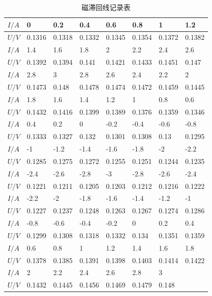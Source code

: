 \documentclass[a4paper,UTF8]{ctexart}
\begin{document}
\begin{table}[H]
    \centering
    \caption{磁滞回线记录表}
    \begin{tabular}{|l|l|l|l|l|l|l|l|}
    \hline
        $I/A$ & 0 & 0.2 & 0.4 & 0.6 & 0.8 & 1 & 1.2 \\ \hline
        $U/V$ & 0.1316 & 0.1318 & 0.1332 & 0.1345 & 0.1354 & 0.1372 & 0.1382 \\ \hline
        $I/A$ & 1.4 & 1.6 & 1.8 & 2 & 2.2 & 2.4 & 2.6 \\ \hline
        $U/V$ & 0.1392 & 0.1394 & 0.141 & 0.1421 & 0.1433 & 0.1451 & 0.147 \\ \hline
        $I/A$ & 2.8 & 3 & 2.8 & 2.6 & 2.4 & 2.2 & 2 \\ \hline
        $U/V$ & 0.1473 & 0.148 & 0.1478 & 0.1474 & 0.1472 & 0.1459 & 0.1445 \\ \hline
        $I/A$ & 1.8 & 1.6 & 1.4 & 1.2 & 1 & 0.8 & 0.6 \\ \hline
        $U/V$ & 0.1432 & 0.1416 & 0.1399 & 0.1389 & 0.1376 & 0.1359 & 0.1346 \\ \hline
        $I/A$ & 0.4 & 0.2 & 0 & -0.2 & -0.4 & -0.6 & -0.8 \\ \hline
        $U/V$ & 0.1333 & 0.1327 & 0.132 & 0.1301 & 0.1308 & 0.13 & 0.1295 \\ \hline
        $I/A$ & -1 & -1.2 & -1.4 & -1.6 & -1.8 & -2 & -2.2 \\ \hline
        $U/V$ & 0.1285 & 0.1275 & 0.1272 & 0.1255 & 0.1251 & 0.1244 & 0.1235 \\ \hline
        $I/A$ & -2.4 & -2.6 & -2.8 & -3 & -2.8 & -2.6 & -2.4 \\ \hline
        $U/V$ & 0.1221 & 0.1211 & 0.1205 & 0.1203 & 0.1212 & 0.1216 & 0.1222 \\ \hline
        $I/A$ & -2.2 & -2 & -1.8 & -1.6 & -1.4 & -1.2 & -1 \\ \hline
        $U/V$ & 0.1227 & 0.1237 & 0.1248 & 0.1263 & 0.1267 & 0.1274 & 0.1286 \\ \hline
        $I/A$ & -0.8 & -0.6 & -0.4 & -0.2 & 0 & 0.2 & 0.4 \\ \hline
        $U/V$ & 0.1299 & 0.1308 & 0.1318 & 0.1332 & 0.134 & 0.1351 & 0.1359 \\ \hline
        $I/A$ & 0.6 & 0.8 & 1 & 1.2 & 1.4 & 1.6 & 1.8 \\ \hline
        $U/V$ & 0.1378 & 0.1385 & 0.1391 & 0.1398 & 0.1403 & 0.1414 & 0.1422 \\ \hline
        $I/A$ & 2 & 2.2 & 2.4 & 2.6 & 2.8 & 3 & ~ \\ \hline
        $U/V$ & 0.1432 & 0.1445 & 0.1456 & 0.1469 & 0.1479 & 0.148 & ~ \\ \hline
    \end{tabular}
\end{table}
\end{document}

